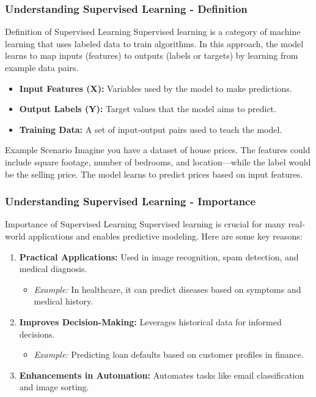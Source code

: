 \documentclass[aspectratio=169]{beamer}
\begin{document}
\begin{frame}[fragile]
    \frametitle{Understanding Supervised Learning - Definition}
    \begin{block}{Definition of Supervised Learning}
        Supervised learning is a category of machine learning that uses labeled data to train algorithms. In this approach, the model learns to map inputs (features) to outputs (labels or targets) by learning from example data pairs.
    \end{block}
    
    \begin{itemize}
        \item \textbf{Input Features (X):} Variables used by the model to make predictions.
        \item \textbf{Output Labels (Y):} Target values that the model aims to predict.
        \item \textbf{Training Data:} A set of input-output pairs used to teach the model.
    \end{itemize}
    
    \begin{block}{Example Scenario}
        Imagine you have a dataset of house prices. The features could include square footage, number of bedrooms, and location—while the label would be the selling price. The model learns to predict prices based on input features.
    \end{block}
\end{frame}

\begin{frame}[fragile]
    \frametitle{Understanding Supervised Learning - Importance}
    \begin{block}{Importance of Supervised Learning}
        Supervised learning is crucial for many real-world applications and enables predictive modeling. Here are some key reasons:
    \end{block}
    
    \begin{enumerate}
        \item \textbf{Practical Applications:} Used in image recognition, spam detection, and medical diagnosis.
            \begin{itemize}
                \item \textit{Example:} In healthcare, it can predict diseases based on symptoms and medical history.
            \end{itemize}
        \item \textbf{Improves Decision-Making:} Leverages historical data for informed decisions.
            \begin{itemize}
                \item \textit{Example:} Predicting loan defaults based on customer profiles in finance.
            \end{itemize}
        \item \textbf{Enhancements in Automation:} Automates tasks like email classification and image sorting.
    \end{enumerate}
\end{frame}
\end{document}
